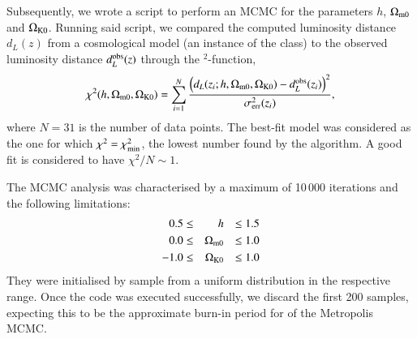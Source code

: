 Subsequently, we wrote a script to perform an MCMC for the parameters $h$, $\Omega_{\mathrm{m}0}$ and $\Omega_{\mathrm{K}0}$. Running said script, we compared the computed luminosity distance $d_L(z)$ from a cosmological model (an instance of the class) to the observed luminosity distance $d_L^\mathrm{obs}(z)$ through the \textchi$^2$-function,
\begin{equation}
    \chi^2(h, \Omega_{\mathrm{m}0}, \Omega_{\mathrm{K}0}) = \sum_{i=1}^N \frac{ \left( d_L(z_i; h, \Omega_{\mathrm{m}0}, \Omega_{\mathrm{K}0}) - d_L^\mathrm{obs}(z_i)\right)^2 }{\sigma_\mathrm{err}^2(z_i)},
\end{equation}
where $N=31$ is the number of data points. The best-fit model was considered as the one for which $\chi^2 = \chi^2_\mathrm{min}$, the lowest number found by the algorithm. A good fit is considered to have $\chi^2/N \sim 1$. 

The MCMC analysis was characterised by a maximum of 10\,000 iterations and the following limitations:
\begin{equation}\label{mil1:imp:eq:mcmc_limits}
    \begin{split}
        0.5 \leq&& h &&\leq 1.5 \\
        0.0 \leq&& \Omega_{\mathrm{m}0} &&\leq 1.0 \\
        -1.0 \leq&& \Omega_{\mathrm{K}0} &&\leq 1.0 
    \end{split}
\end{equation}
They were initialised by sample from a uniform distribution in the respective range. Once the code was executed successfully, we discard the first 200 samples, expecting this to be the approximate burn-in period for of the Metropolis MCMC.
